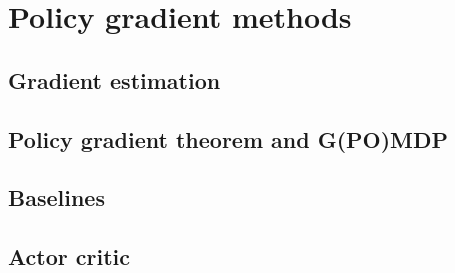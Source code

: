 \section{Policy gradient methods}
\subsection{Gradient estimation}
\subsection{Policy gradient theorem and G(PO)MDP}
\subsection{Baselines}
\subsection{Actor critic}



 